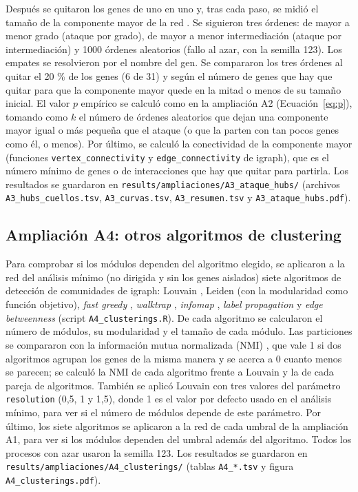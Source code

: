 Después se quitaron los genes de uno en uno y, tras cada paso, se midió el tamaño de la componente mayor de la red \cite{Albert2000}. Se siguieron tres órdenes: de mayor a menor grado (ataque por grado), de mayor a menor intermediación (ataque por intermediación) y 1000 órdenes aleatorios (fallo al azar, con la semilla 123). Los empates se resolvieron por el nombre del gen. Se compararon los tres órdenes al quitar el 20 \% de los genes (6 de 31) y según el número de genes que hay que quitar para que la componente mayor quede en la mitad o menos de su tamaño inicial. El valor $p$ empírico se calculó como en la ampliación A2 (Ecuación~\ref{eq:p}), tomando como $k$ el número de órdenes aleatorios que dejan una componente mayor igual o más pequeña que el ataque (o que la parten con tan pocos genes como él, o menos). Por último, se calculó la conectividad de la componente mayor (funciones \texttt{vertex\_connectivity} y \texttt{edge\_connectivity} de igraph), que es el número mínimo de genes o de interacciones que hay que quitar para partirla. Los resultados se guardaron en \texttt{results/ampliaciones/A3\_ataque\_hubs/} (archivos \texttt{A3\_hubs\_cuellos.tsv}, \texttt{A3\_curvas.tsv}, \texttt{A3\_resumen.tsv} y \texttt{A3\_ataque\_hubs.pdf}).

\subsection{Ampliación A4: otros algoritmos de clustering}

Para comprobar si los módulos dependen del algoritmo elegido, se aplicaron a la red del análisis mínimo (no dirigida y sin los genes aislados) siete algoritmos de detección de comunidades de igraph: Louvain \cite{Blondel2008}, Leiden \cite{Traag2019} (con la modularidad como función objetivo), \textit{fast greedy} \cite{Clauset2004}, \textit{walktrap} \cite{Pons2006}, \textit{infomap} \cite{Rosvall2008}, \textit{label propagation} \cite{Raghavan2007} y \textit{edge betweenness} \cite{Girvan2002} (script \texttt{A4\_clusterings.R}). De cada algoritmo se calcularon el número de módulos, su modularidad y el tamaño de cada módulo. Las particiones se compararon con la información mutua normalizada (NMI) \cite{Danon2005}, que vale 1 si dos algoritmos agrupan los genes de la misma manera y se acerca a 0 cuanto menos se parecen; se calculó la NMI de cada algoritmo frente a Louvain y la de cada pareja de algoritmos. También se aplicó Louvain con tres valores del parámetro \texttt{resolution} (0,5, 1 y 1,5), donde 1 es el valor por defecto usado en el análisis mínimo, para ver si el número de módulos depende de este parámetro. Por último, los siete algoritmos se aplicaron a la red de cada umbral de la ampliación A1, para ver si los módulos dependen del umbral además del algoritmo. Todos los procesos con azar usaron la semilla 123. Los resultados se guardaron en \texttt{results/ampliaciones/A4\_clusterings/} (tablas \texttt{A4\_*.tsv} y figura \texttt{A4\_clusterings.pdf}).

